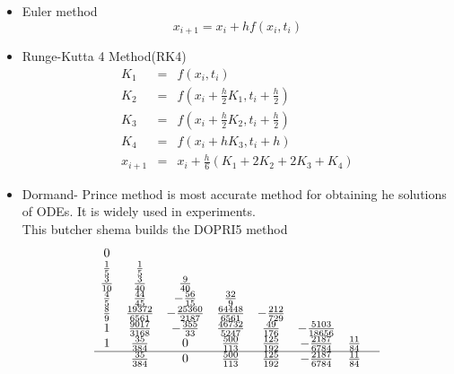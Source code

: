 \begin{itemize}
	\item Euler method
		\begin{equation}
			x_{i+1} = x_i + hf(x_i,t_i)
		\end{equation}
	\item Runge-Kutta 4 Method(RK4)
		\begin{eqnarray}
			K_1 &=& f(x_i,t_i)\\
			K_2 &=& f(x_i + \frac{h}{2}K_1,t_i +\frac{h}{2})\\
			K_3 &=& f(x_i + \frac{h}{2}K_2,t_i+\frac{h}{2})\\
			K_4 &=& f(x_i + hK_3,t_i +h)\\
			x_{i+1} &=& x_i + \frac{h}{6}(K_1 + 2K_2 +2K_3 +K_4)
		\end{eqnarray}	
	\item Dormand- Prince method is most accurate method for obtaining he solutions of ODEs\cite{dopri5}.
	It is widely used in experiments.\\
	This butcher shema builds the DOPRI5 method
	\begin{equation}
	\begin{matrix}
		0 & & & & & & & \\
		\frac{1}{5}  & \frac{1}{5} & & & & & &\\
		\frac{3}{10} &\frac{3}{40} &\frac{9}{40} & & & & & \\
		\frac{4}{5}& \frac{44}{45}& -\frac{56}{15}& \frac{32}{9} & & & &\\
		\frac{8}{9} &\frac{19372}{6561} &-\frac{25360}{2187} &\frac{64448}{6561}& -\frac{212}{729} & & &\\
		1 & \frac{9017}{3168} &-\frac{355}{33}&\frac{46732}{5247}&\frac{49}{176}&-\frac{5103}{18656} & \\
		1 & \frac{35}{384} &0&\frac{500}{113}&\frac{125}{192}&-\frac{2187}{6784} & \frac{11}{84}\\
		
	\hline
	& \frac{35}{384} &0&\frac{500}{113}&\frac{125}{192}&-\frac{2187}{6784} & \frac{11}{84}\\
	\end{matrix}
	\end{equation}	
\end{itemize}
